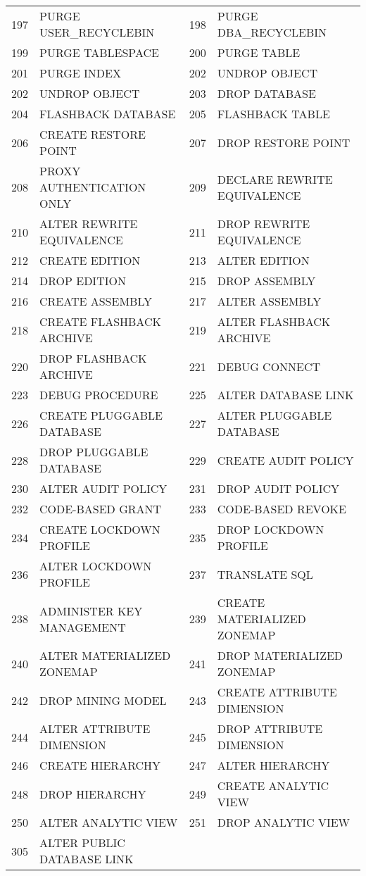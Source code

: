 \begin{appendix}
\begin{longtable}[]{@{}rl|rl@{}}
197 & PURGE USER\_RECYCLEBIN       & 198 & PURGE DBA\_RECYCLEBIN        \\
199 & PURGE TABLESPACE             & 200 & PURGE TABLE                  \\
201 & PURGE INDEX                  & 202 & UNDROP OBJECT                \\
202 & UNDROP OBJECT                & 203 & DROP DATABASE                \\
204 & FLASHBACK DATABASE           & 205 & FLASHBACK TABLE              \\
206 & CREATE RESTORE POINT         & 207 & DROP RESTORE POINT           \\
208 & PROXY AUTHENTICATION ONLY    & 209 & DECLARE REWRITE EQUIVALENCE  \\
210 & ALTER REWRITE EQUIVALENCE    & 211 & DROP REWRITE EQUIVALENCE     \\
212 & CREATE EDITION               & 213 & ALTER EDITION                \\
214 & DROP EDITION                 & 215 & DROP ASSEMBLY                \\
216 & CREATE ASSEMBLY              & 217 & ALTER ASSEMBLY               \\
218 & CREATE FLASHBACK ARCHIVE     & 219 & ALTER FLASHBACK ARCHIVE      \\
220 & DROP FLASHBACK ARCHIVE       & 221 & DEBUG CONNECT                \\
223 & DEBUG PROCEDURE              & 225 & ALTER DATABASE LINK          \\
226 & CREATE PLUGGABLE DATABASE    & 227 & ALTER PLUGGABLE DATABASE     \\
228 & DROP PLUGGABLE DATABASE      & 229 & CREATE AUDIT POLICY          \\
230 & ALTER AUDIT POLICY           & 231 & DROP AUDIT POLICY            \\
232 & CODE-BASED GRANT             & 233 & CODE-BASED REVOKE            \\
234 & CREATE LOCKDOWN PROFILE      & 235 & DROP LOCKDOWN PROFILE        \\
236 & ALTER LOCKDOWN PROFILE       & 237 & TRANSLATE SQL                \\
238 & ADMINISTER KEY MANAGEMENT    & 239 & CREATE MATERIALIZED ZONEMAP  \\
240 & ALTER MATERIALIZED ZONEMAP   & 241 & DROP MATERIALIZED ZONEMAP    \\
242 & DROP MINING MODEL            & 243 & CREATE ATTRIBUTE DIMENSION   \\
244 & ALTER ATTRIBUTE DIMENSION    & 245 & DROP ATTRIBUTE DIMENSION     \\
246 & CREATE HIERARCHY             & 247 & ALTER HIERARCHY              \\
248 & DROP HIERARCHY               & 249 & CREATE ANALYTIC VIEW         \\
250 & ALTER ANALYTIC VIEW          & 251 & DROP ANALYTIC VIEW           \\
305 & ALTER PUBLIC DATABASE LINK   \\


\end{longtable}
\end{appendix}
